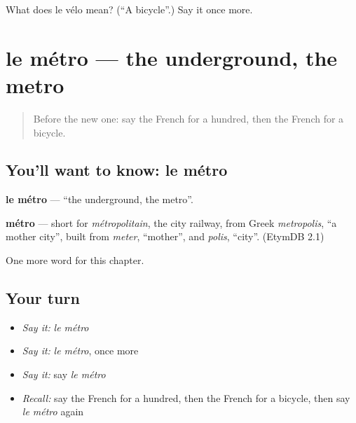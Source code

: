 \begin{tcolorbox}[breakable,colback=teal!4,colframe=teal!35!black,title={Before you move on}]
What does le vélo mean? (\textquotedblleft{}A bicycle\textquotedblright{}.) Say it once more.
\end{tcolorbox}
\section[le métro]{le métro — the underground, the metro}

\label{lesson:FR-C106-metro}



\begin{quote}
Before the new one: say the French for a hundred, then the French for a bicycle.
\end{quote}

\subsection*{You'll want to know: le métro}
\textbf{le métro} — \textquotedblleft{}the underground, the metro\textquotedblright{}.

\begin{cousinweb}
\textbf{métro} — short for \emph{métropolitain}, the city railway, from Greek \emph{metropolis}, \textquotedblleft{}a mother city\textquotedblright{}, built from \emph{meter}, \textquotedblleft{}mother\textquotedblright{}, and \emph{polis}, \textquotedblleft{}city\textquotedblright{}. (EtymDB 2.1)
\end{cousinweb}

\begin{grammarlens}[title={What you've built}]
One more word for this chapter.
\end{grammarlens}

\subsection*{Your turn}
\begin{itemize}
\raggedright
  \item \emph{Say it:} \emph{le métro}
  \item \emph{Say it:} \emph{le métro}, once more
  \item \emph{Say it:} say \emph{le métro}
  \item \emph{Recall:} say the French for a hundred, then the French for a bicycle, then say \emph{le métro} again
\end{itemize}

